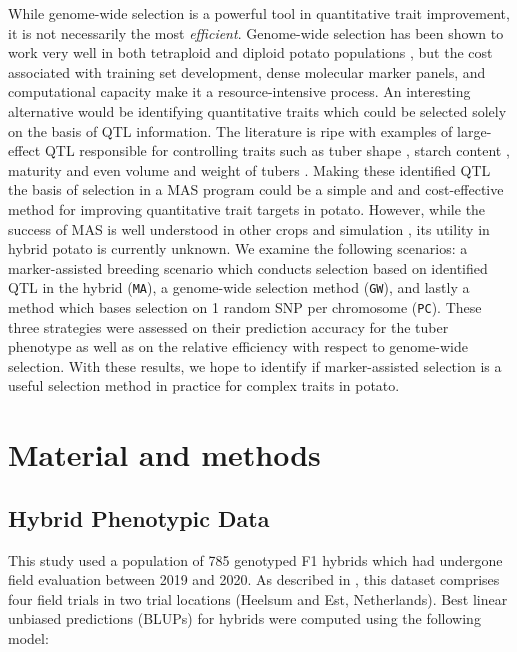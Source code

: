 \begin{refsection}
While genome-wide selection is a powerful tool in quantitative trait
improvement, it is not necessarily the most \emph{efficient}.
Genome-wide selection has been shown to work very well in both
tetraploid and diploid potato populations
\parencite{Adams2023,Wilson2021}, but the cost associated with training
set development, dense molecular marker panels, and computational
capacity make it a resource-intensive process. An interesting
alternative would be identifying quantitative traits which could be
selected solely on the basis of QTL information. The literature is ripe
with examples of large-effect QTL responsible for controlling traits
such as tuber shape \parencite{Eck2022}, starch content
\parencite{Li2019a}, maturity \parencite{Li2018,Massa2015} and even volume
and weight of tubers \parencite{Korontzis2020,Clot2024}. Making these
identified QTL the basis of selection in a MAS program could be a simple
and and cost-effective method for improving quantitative trait targets in
potato. However, while the success of MAS is well understood in other
crops and simulation \parencite{Podlich2004, VanBerloo2008}, its utility in hybrid
potato is currently unknown. We examine the following scenarios: a
marker-assisted breeding scenario which conducts selection based on
identified QTL in the hybrid (\texttt{MA}), a genome-wide selection
method (\texttt{GW}), and lastly a method which bases selection on 1
random SNP per chromosome (\texttt{PC}). These three strategies were
assessed on their prediction accuracy for the tuber phenotype as well as
on the relative efficiency with respect to genome-wide selection. With
these results, we hope to identify if marker-assisted selection is a
useful selection method in practice for complex traits in potato.
\section{Material and methods}

\subsection{Hybrid Phenotypic Data}\label{hybrid-phenotypic-data}

This study used a population of 785 genotyped F1 hybrids which had
undergone field evaluation between 2019 and 2020. As described in
\parencite{Adams2023}, this dataset comprises four field trials in two
trial locations (Heelsum and Est, Netherlands). Best linear unbiased
predictions (BLUPs) for hybrids were computed using the following model:


\end{refsection}
